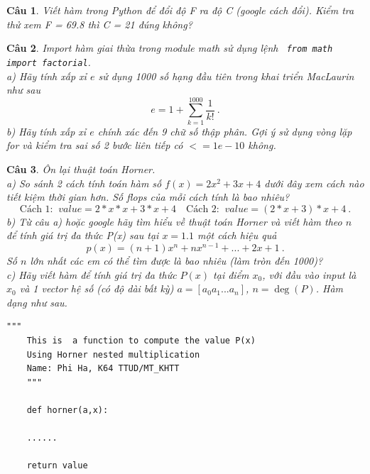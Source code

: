 \documentclass[answers]{exam}
\newtheorem{bt}{Câu}
\begin{document}


\begin{bt}\label{bt1}
Viết hàm trong Python để đổi độ F ra độ C (google cách đổi). Kiểm tra thử xem F = 69.8 thì C = 21 đúng không?
%
%
%
\end{bt}

\begin{bt} 
	Import hàm giai thừa trong module math sử dụng lệnh \verb| from math import factorial|. \\
	a) Hãy tính xấp xỉ $e$ sử dụng 1000 số hạng đầu tiên trong khai triển MacLaurin như sau
	\[
	e = 1 + \sum_{k=1}^{1000} \dfrac{1}{k!} \ .
	\]
	b) Hãy tính xấp xỉ $e$ chính xác đến 9 chữ số thập phân. Gợi ý sử dụng vòng lặp for và kiểm tra sai số 2 bước liên tiếp có $<= 1e-10$ không.
\end{bt}

\begin{bt} Ôn lại thuật toán Horner. \\
a) So sánh 2 cách tính toán hàm số $f(x) = 2x^2 + 3 x + 4$ dưới đây xem cách nào tiết kiệm thời gian hơn. Số flops của mỗi cách tính là bao nhiêu?
%
\begin{equation}
 \mbox{Cách 1: } \	value = 2 * x * x + 3 * x + 4 \quad  \mbox{Cách 2: } \	value = (2 * x + 3) * x + 4 \ .
\end{equation}
%
b) Từ câu a) hoặc google hãy tìm hiểu về thuật toán Horner và viết hàm theo $n$ để tính giá trị đa thức P(x) sau tại $x = 1.1$ một cách hiệu quả
%
\[
p(x) = (n+1) x^n + n x^{n-1} + ... + 2x + 1 \ .
\]
%
Số $n$ lớn nhất các em có thể tìm được là bao nhiêu (làm tròn đến 1000)? \\
c) Hãy viết hàm để tính giá trị đa thức $P(x)$ tại điểm $x_0$, với đầu vào input là $x_0$ và 1 vector hệ số (có độ dài bất kỳ) $a = [a_0 a_{1} ... a_{n}]$, $n = \deg(P)$. Hàm dạng như sau.

%
\begin{lstlisting}[frame=single] 
	"""
	This is  a function to compute the value P(x)
	Using Horner nested multiplication
	Name: Phi Ha, K64 TTUD/MT_KHTT
	"""
	
	def horner(a,x):
	
	......
	
	return value
\end{lstlisting}
%
\end{bt}
\end{document}
